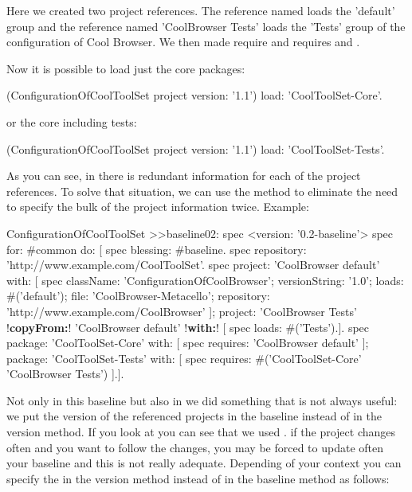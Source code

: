 \documentclass[a4paper,10pt,twoside]{book}
\begin{document}
Here we created two project references. The reference named  loads the 'default' group and the reference named 'CoolBrowser Tests'  loads the 'Tests' group of the configuration of Cool Browser. We then made  require  and  requires  and .

Now it is possible to load just the core packages:

\begin{code}{}
(ConfigurationOfCoolToolSet project version: '1.1') load: 'CoolToolSet-Core'.
\end{code} 
or the core including tests:
 
\begin{code}{}
  (ConfigurationOfCoolToolSet project version: '1.1') load: 'CoolToolSet-Tests'.
\end{code}

As you can see, in  there is redundant information for each of the project references. To solve that situation, we can use the  method to eliminate the need to specify the bulk of the project information twice. Example:

\begin{code}{}
ConfigurationOfCoolToolSet >>baseline02: spec 
	<version: '0.2-baseline'>
	spec for: #common do: [
		spec blessing: #baseline.
		spec repository: 'http://www.example.com/CoolToolSet'.
		spec project: 'CoolBrowser default' with: [
				spec
					className: 'ConfigurationOfCoolBrowser';
					versionString: '1.0';
					loads: #('default');
					file: 'CoolBrowser-Metacello';
					repository: 'http://www.example.com/CoolBrowser' ];
			project: 'CoolBrowser Tests' 
				!\textbf{copyFrom:}! 'CoolBrowser default' 
				!\textbf{with:}! [ spec loads: #('Tests').].
		spec 
			package: 'CoolToolSet-Core' with: [ spec requires: 'CoolBrowser default' ];
			package: 'CoolToolSet-Tests' with: [ 
				spec requires: #('CoolToolSet-Core' 'CoolBrowser Tests') ].].					
\end{code}

Not only in this baseline but also in  we did something that is not always useful: we put the version of the referenced projects in the baseline instead of in the version method. If you look at  you can see that we used . if the project changes often and you want to follow the changes, you may be forced to update often your baseline and this is not really adequate. Depending of your context you can specify the  in the version method instead of in the baseline method as follows: 
\end{document}
